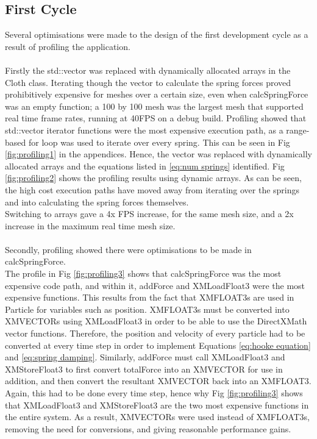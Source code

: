 \subsection{First Cycle}
\doublespaced
Several optimisations were made to the design of the first development cycle as a result of profiling the application.
\\\\Firstly the std::vector was replaced with dynamically allocated arrays in the Cloth class. Iterating though the vector to calculate the spring forces proved prohibitively expensive for meshes over a certain size, even when calcSpringForce was an empty function; a 100 by 100 mesh was the largest mesh that supported real time frame rates, running at 40FPS on a debug build. Profiling showed that std::vector iterator functions were the most expensive execution path, as a range-based for loop was used to iterate over every spring. This can be seen in Fig \ref{fig:profiling1} in the appendices. Hence, the vector was replaced with dynamically allocated arrays and the equations listed in \ref{eq:num springs} identified. Fig \ref{fig:profiling2} shows the profiling results using dynamic arrays. As can be seen, the high cost execution paths have moved away from iterating over the springs and into calculating the spring forces themselves.
\\Switching to arrays gave a 4x FPS increase, for the same mesh size, and a 2x increase in the maximum real time mesh size.
\\\\Secondly, profiling showed there were optimisations to be made in calcSpringForce.
\\The profile in Fig \ref{fig:profiling3} shows that calcSpringForce was the most expensive code path, and within it, addForce and XMLoadFloat3 were the most expensive functions. This results from the fact that XMFLOAT3s are used in Particle for variables such as position. XMFLOAT3s must be converted into XMVECTORs using XMLoadFloat3 in order to be able to use the DirectXMath vector functions. Therefore, the position and velocity of every particle had to be converted at every time step in order to implement Equations \ref{eq:hooke equation} and \ref{eq:spring damping}. Similarly, addForce must call XMLoadFloat3 and XMStoreFloat3 to first convert totalForce into an XMVECTOR for use in addition, and then convert the resultant XMVECTOR back into an XMFLOAT3. Again, this had to be done every time step, hence why Fig \ref{fig:profiling3} shows that XMLoadFloat3 and XMStoreFloat3 are the two most expensive functions in the entire system. As a result, XMVECTORs were used instead of XMFLOAT3s, removing the need for conversions, and giving reasonable performance gains.
